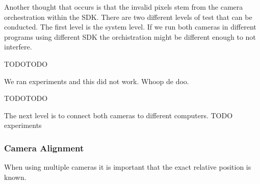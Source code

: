 Another thought that occurs is that the invalid pixels stem from the camera orchestration within the SDK. There are two different levels of test that can be conducted. The first level is the system level. If we run both cameras in different programs using different SDK the orchistration might be different enough to not interfere.

TODOTODO

We ran experiments and this did not work. Whoop de doo.

TODOTODO

The next level is to connect both cameras to different computers. TODO experiments

\subsubsection{Camera Alignment}

When using multiple cameras it is important that the exact relative position is known.